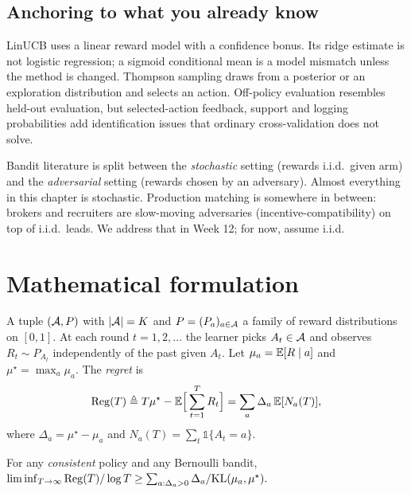 \documentclass[11pt,oneside]{scrbook}
\newcommand{\Reg}{\mathrm{Reg}}
\begin{document}
\section{Anchoring to what you already know}

LinUCB uses a linear reward model with a confidence bonus. Its ridge
estimate is not logistic regression; a sigmoid conditional mean is a
model mismatch unless the method is changed. Thompson sampling draws
from a posterior or an exploration distribution and selects an action.
Off-policy evaluation resembles held-out evaluation, but selected-action
feedback, support and logging probabilities add identification issues
that ordinary cross-validation does not solve.


\begin{pitfall}
Bandit literature is split between the \emph{stochastic} setting (rewards
i.i.d.\ given arm) and the \emph{adversarial} setting (rewards chosen by an
adversary). Almost everything in this chapter is stochastic. Production
matching is somewhere in between: brokers and recruiters are slow-moving
adversaries (incentive-compatibility) on top of i.i.d.\ leads. We address
that in Week 12; for now, assume i.i.d.
\end{pitfall}

\chapter{Mathematical formulation}

\begin{definition}
A tuple $(\mathcal{A}, P)$ with $|\mathcal{A}|=K$ and $P = (P_a)_{a\in\mathcal{A}}$ a
family of reward distributions on $[0,1]$. At each round $t=1,2,\dots$ the
learner picks $A_t \in \mathcal{A}$ and observes $R_t \sim P_{A_t}$ independently
of the past given $A_t$. Let $\mu_a = \mathbb{E}[R \mid a]$ and
$\mu^\star = \max_a \mu_a$. The \emph{regret} is
\[
\Reg(T) \defeq T \mu^\star - \E\Big[\sum_{t=1}^T R_t\Big]
     = \sum_a \Delta_a\, \E[N_a(T)],
\]
where $\Delta_a = \mu^\star - \mu_a$ and $N_a(T) = \sum_t \mathbb{1}\{A_t = a\}$.
\end{definition}

\begin{theorem}
For any \emph{consistent} policy and any Bernoulli bandit,
$\liminf_{T\to\infty} \Reg(T) / \log T \geq \sum_{a:\Delta_a>0}
\Delta_a / \KL(\mu_a, \mu^\star).$
\end{theorem}
\end{document}
